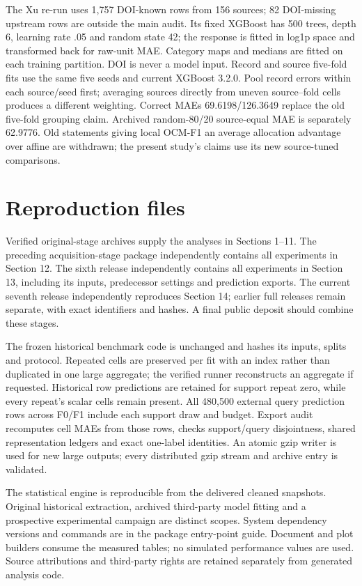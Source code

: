 \documentclass[11pt]{article}
\begin{document}
The Xu re-run uses 1,757 DOI-known rows from 156 sources; 82 DOI-missing upstream rows are outside the main audit. Its fixed XGBoost has 500 trees, depth 6, learning rate .05 and random state 42; the response is fitted in log1p space and transformed back for raw-unit MAE. Category maps and medians are fitted on each training partition. DOI is never a model input. Record and source five-fold fits use the same five seeds and current XGBoost 3.2.0. Pool record errors within each source/seed first; averaging sources directly from uneven source--fold cells produces a different weighting. Correct MAEs 69.6198/126.3649 replace the old five-fold grouping claim. Archived random-80/20 source-equal MAE is separately 62.9776. Old statements giving local OCM-F1 an average allocation advantage over affine are withdrawn; the present study's claims use its new source-tuned comparisons.

\section{Reproduction files}
Verified original-stage archives supply the analyses in Sections 1--11. The preceding acquisition-stage package independently contains all experiments in Section 12. The sixth release independently contains all experiments in Section 13, including its inputs, predecessor settings and prediction exports. The current seventh release independently reproduces Section 14; earlier full releases remain separate, with exact identifiers and hashes. A final public deposit should combine these stages.

The frozen historical benchmark code is unchanged and hashes its inputs, splits and protocol. Repeated cells are preserved per fit with an index rather than duplicated in one large aggregate; the verified runner reconstructs an aggregate if requested. Historical row predictions are retained for support repeat zero, while every repeat's scalar cells remain present. All 480,500 external query prediction rows across F0/F1 include each support draw and budget. Export audit recomputes cell MAEs from those rows, checks support/query disjointness, shared representation ledgers and exact one-label identities. An atomic gzip writer is used for new large outputs; every distributed gzip stream and archive entry is validated.

The statistical engine is reproducible from the delivered cleaned snapshots. Original historical extraction, archived third-party model fitting and a prospective experimental campaign are distinct scopes. System dependency versions and commands are in the package entry-point guide. Document and plot builders consume the measured tables; no simulated performance values are used. Source attributions and third-party rights are retained separately from generated analysis code.
\end{document}
